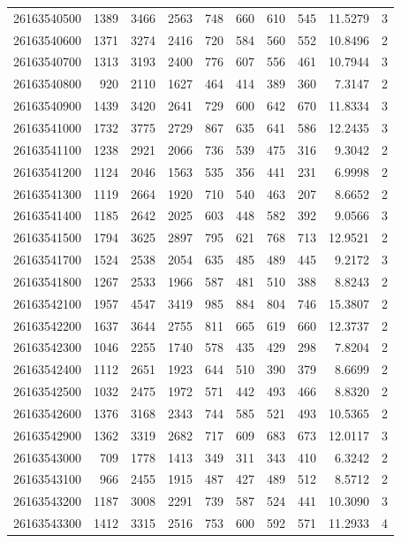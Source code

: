 \documentclass[
  11pt,
]{article}
\begin{document}
\begin{longtable}[t]{lrrrrrrrrr}
26163540500 & 1389 & 3466 & 2563 & 748 & 660 & 610 & 545 & 11.5279 & 3\\
26163540600 & 1371 & 3274 & 2416 & 720 & 584 & 560 & 552 & 10.8496 & 2\\
26163540700 & 1313 & 3193 & 2400 & 776 & 607 & 556 & 461 & 10.7944 & 3\\
26163540800 & 920 & 2110 & 1627 & 464 & 414 & 389 & 360 & 7.3147 & 2\\
26163540900 & 1439 & 3420 & 2641 & 729 & 600 & 642 & 670 & 11.8334 & 3\\
26163541000 & 1732 & 3775 & 2729 & 867 & 635 & 641 & 586 & 12.2435 & 3\\
26163541100 & 1238 & 2921 & 2066 & 736 & 539 & 475 & 316 & 9.3042 & 2\\
26163541200 & 1124 & 2046 & 1563 & 535 & 356 & 441 & 231 & 6.9998 & 2\\
26163541300 & 1119 & 2664 & 1920 & 710 & 540 & 463 & 207 & 8.6652 & 2\\
26163541400 & 1185 & 2642 & 2025 & 603 & 448 & 582 & 392 & 9.0566 & 3\\
26163541500 & 1794 & 3625 & 2897 & 795 & 621 & 768 & 713 & 12.9521 & 2\\
26163541700 & 1524 & 2538 & 2054 & 635 & 485 & 489 & 445 & 9.2172 & 3\\
26163541800 & 1267 & 2533 & 1966 & 587 & 481 & 510 & 388 & 8.8243 & 2\\
26163542100 & 1957 & 4547 & 3419 & 985 & 884 & 804 & 746 & 15.3807 & 2\\
26163542200 & 1637 & 3644 & 2755 & 811 & 665 & 619 & 660 & 12.3737 & 2\\
26163542300 & 1046 & 2255 & 1740 & 578 & 435 & 429 & 298 & 7.8204 & 2\\
26163542400 & 1112 & 2651 & 1923 & 644 & 510 & 390 & 379 & 8.6699 & 2\\
26163542500 & 1032 & 2475 & 1972 & 571 & 442 & 493 & 466 & 8.8320 & 2\\
26163542600 & 1376 & 3168 & 2343 & 744 & 585 & 521 & 493 & 10.5365 & 2\\
26163542900 & 1362 & 3319 & 2682 & 717 & 609 & 683 & 673 & 12.0117 & 3\\
26163543000 & 709 & 1778 & 1413 & 349 & 311 & 343 & 410 & 6.3242 & 2\\
26163543100 & 966 & 2455 & 1915 & 487 & 427 & 489 & 512 & 8.5712 & 2\\
26163543200 & 1187 & 3008 & 2291 & 739 & 587 & 524 & 441 & 10.3090 & 3\\
26163543300 & 1412 & 3315 & 2516 & 753 & 600 & 592 & 571 & 11.2933 & 4\\

\end{longtable}
\end{document}
